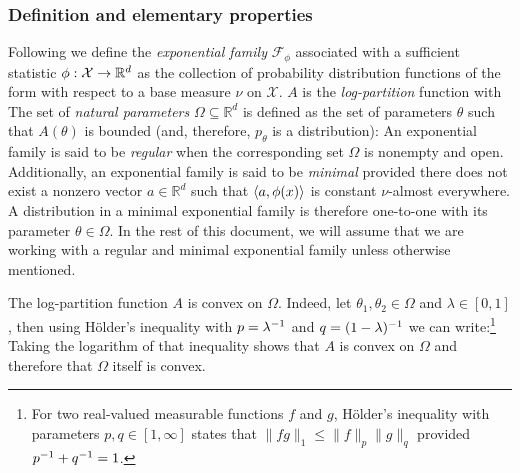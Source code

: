 
\subsubsection{Definition and elementary properties}
Following  we define the \emph{exponential family} $\mathcal F_\phi$ associated with a sufficient statistic $\phi:\mathcal X\to\mathbb R^{d}$ as the collection of probability distribution functions of the form
%
%
with respect to a base measure $\nu$ on $\mathcal X$. $A$ is the \emph{log-partition} function with
%
%
The set of \emph{natural parameters} $\Omega \subseteq \mathbb R^{d}$ is defined as the set of parameters $\theta$ such that $A(\theta)$ is bounded (and, therefore, $p_\theta$ is a distribution):
%
An exponential family is said to be \emph{regular} when the corresponding set $\Omega$ is nonempty and open. Additionally, an exponential family is said to be \emph{minimal} provided there does not exist a nonzero vector $a\in\mathbb R^{d}$ such that $\left\langle a,\phi(x) \right\rangle$ is constant $\nu$-almost everywhere. A distribution in a minimal exponential family is therefore one-to-one with its parameter $\theta\in\Omega$. In the rest of this document, we will assume that we are working with a regular and minimal exponential family unless otherwise mentioned.

The log-partition function $A$ is convex on $\Omega$. Indeed, let $\theta_1,\theta_2\in\Omega$ and $\lambda\in[0,1]$, then using H\"older's inequality with $p=\lambda^{-1}$ and $q=(1-\lambda)^{-1}$ we can write:\footnote{For two real-valued measurable functions $f$ and $g$, H\"older's inequality with parameters $p,q\in[1,\infty]$ states that $\|fg\|_{1}\le \|f\|_{p}\|g\|_{q}$ provided $p^{-1}+q^{-1}=1$.}
Taking the logarithm of that inequality shows that $A$ is convex on $\Omega$ and therefore that $\Omega$ itself is convex.

